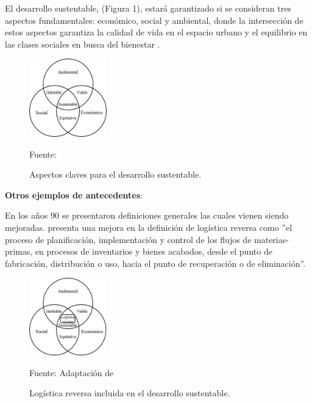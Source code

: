 \documentclass[a4paper, 12pt]{article}
\begin{document}
El desarrollo sustentable, (Figura 1), estará garantizado si se consideran tres aspectos fundamentales: económico, social y ambiental, donde la intersección de estos aspectos garantiza la calidad de vida en el espacio urbano y el equilibrio en las clases sociales en busca del bienestar \citep{Tanguay}.

\begin{figure}[ht]
\begin{center}
\includegraphics[width=0.3\textwidth]{Figura2}
\end{center}
\begin{center}
\vskip -0.5cm
\caption{\small{Aspectos claves para el desarrollo sustentable.}}
{\small{Fuente: \cite{Tanguay}}}
\end{center}
\end{figure}


\vskip 0.4cm
{\bf Otros ejemplos de antecedentes}: \par

En los años 90 se presentaron definiciones generales las cuales vienen siendo mejoradas. \cite{Dekker} presenta una mejora en la definición de logística reversa como  ”el proceso de planificación, implementación y control de los flujos de materias-primas, en procesos de inventarios y bienes acabados, desde el punto de fabricación, distribución o uso, hacia el punto de recuperación o de eliminación”. 


\begin{figure}[ht]
\begin{center}
\includegraphics[width=0.3\textwidth]{Figura1}
\end{center}
\begin{center}
\vskip -0.5cm
\caption{\small{Logística reversa incluida en el desarrollo sustentable.}}
{\small{Fuente: Adaptación de \cite{Tanguay}}}
\end{center}
\end{figure}
\end{document}

